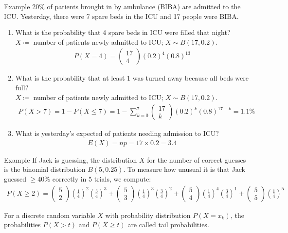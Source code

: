 \documentclass{report}
\newcommand{\cvec}[1]{ \begin{pmatrix} #1 \end{pmatrix} }
\begin{document}
\begin{enumerate}
		\begin{question}{Example}
			20\% of patients brought in by ambulance (BIBA) are admitted to the ICU. Yesterday, there were 7 spare beds in the ICU and 17 people were BIBA.
			\begin{enumerate}
				\item What is the probability that 4 spare beds in ICU were filled that night?	\\
					$X \coloneq $ number of patients newly admitted to ICU; $X \sim B(17,0.2)$.
					\begin{align*}
						P(X = 4) = \cvec{17\\4} (0.2)^4(0.8)^{13}
					\end{align*}
				\item What is the probability that at least 1 was turned away because all beds were full?	\\
					$X \coloneq $ number of patients newly admitted to ICU; $X \sim B(17,0.2)$.
					\begin{align*}
						P(X > 7) = 1 - P(X \leq 7) = 1 - \sum_{k=0}^7 \cvec{17\\k} (0.2)^k(0.8)^{17-k} = 1.1\%
					\end{align*}
				\item What is yesterday's expected of patients needing admission to ICU?
					\begin{align*}
						E(X) = np = 17 \times 0.2 = 3.4
					\end{align*}
			\end{enumerate}
		\end{question}
		\begin{question}{Example}
			If Jack is guessing, the distribution $X$ for the number of correct guesses is the binomial distribution $B(5, 0.25)$. To measure how unusual it is that Jack guessed $ \geq 40\%$ correctly in 5 trials, we compute:
			\begin{align*}
				P(X \geq 2) = \cvec{5\\2} \left(\frac{1}{4}\right)^2 \left(\frac{3}{4}\right)^3 + \cvec{5\\3} \left(\frac{1}{4}\right)^3 \left(\frac{3}{4}\right)^2 + \cvec{5\\4} \left(\frac{1}{4}\right)^4 \left(\frac{3}{4}\right)^1 + \cvec{5\\5} \left(\frac{1}{4}\right)^5
			\end{align*}
		\end{question}
		For a discrete random variable $X$ with probability distribution $P(X = x_k)$, the probabilities $P(X > t)$ and $P(X \geq t)$ are called tail probabilities.


\end{enumerate}
\end{document}
